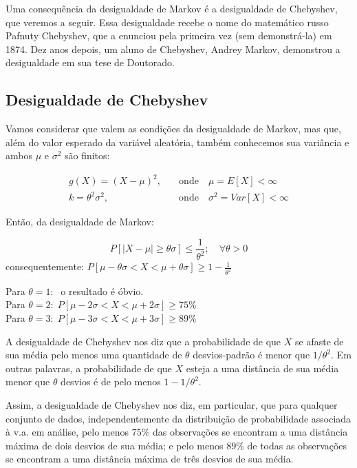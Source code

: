 \documentclass[
]{book}
\theoremstyle{definition}
\theoremstyle{definition}
\theoremstyle{definition}
\theoremstyle{remark}
\begin{document}
Uma consequência da desigualdade de Markov é a desigualdade de Chebyshev, que veremos a seguir. Essa desigualdade recebe o nome do matemático russo Pafnuty Chebyshev, que a enunciou pela primeira vez (sem demonstrá-la) em 1874. Dez anos depois, um aluno de Chebyshev, Andrey Markov, demonstrou a desigualdade em sua tese de Doutorado.

\hypertarget{desigualdade-de-chebyshev}{%
\subsection*{Desigualdade de Chebyshev}\label{desigualdade-de-chebyshev}}

Vamos considerar que valem as condições da desigualdade de Markov, mas que, além do valor esperado da variável aleatória, também conhecemos sua variância e ambos \(\mu\) e \(\sigma^2\) são finitos:

\begin{align*}
{g(X) = (X - \mu)^2}, \quad &\text{onde} \quad {\mu = E[X] < \infty}\\
{k = \theta^2 \sigma^2},\quad &\text{onde} \quad {\sigma^2 = Var[X] < \infty}
\end{align*}

Então, da desigualdade de Markov:

\[{P[|X-\mu|\geq \theta\sigma] \leq \frac{1}{\theta^2}; \quad \forall \theta>0}\]
consequentemente: \({P[\mu - \theta\sigma < X < \mu + \theta\sigma] \geq 1 - \frac{1}{\theta^2}}\)

Para \(\theta = 1: \;\) o resultado é óbvio.\\
Para \(\theta = 2: \; P[\mu - 2\sigma < X < \mu + 2\sigma] \geq 75\%\)\\
Para \(\theta = 3: \; P[\mu - 3\sigma < X < \mu + 3\sigma] \geq 89\%\)

A desigualdade de Chebyshev nos diz que a probabilidade de que \(X\) se afaste de sua média pelo menos uma quantidade de \(\theta\) desvios-padrão é menor que \(1/\theta^2\). Em outras palavras, a probabilidade de que \(X\) esteja a uma distância de sua média menor que \(\theta\) desvios é de pelo menos \(1 - 1/\theta^2\).

Assim, a desigualdade de Chebyshev nos diz, em particular, que para qualquer conjunto de dados, independentemente da distribuição de probabilidade associada à v.a. em análise, pelo menos 75\% das observações se encontram a uma distância máxima de dois desvios de sua média; e pelo menos 89\% de todas as observações se encontram a uma distância máxima de três desvios de sua média.
\end{document}

